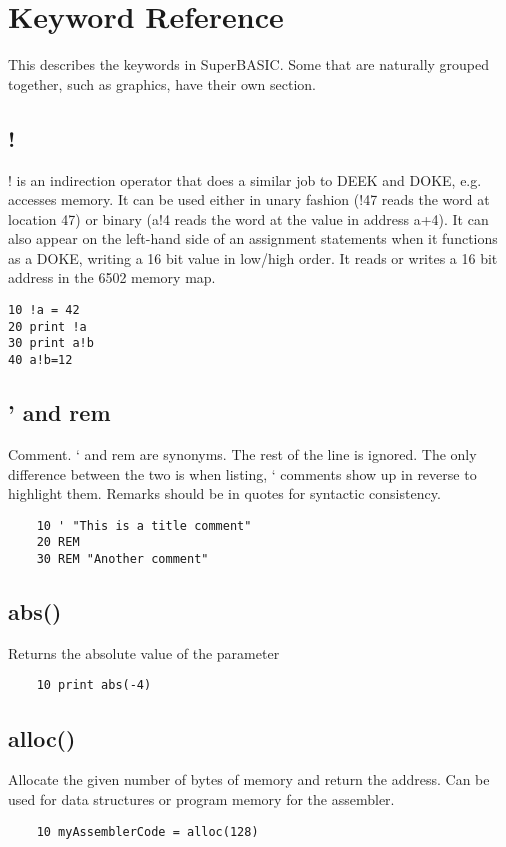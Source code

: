 \chapter{Keyword Reference}

This describes the keywords in SuperBASIC. Some that are naturally grouped together, such as graphics, have their own section.

\section*{!}
! is an indirection operator that does a similar job to DEEK and DOKE, e.g. accesses memory. It can be used either in unary fashion (!47 reads the word at location 47) or binary (a!4 reads the word at the value in address a+4). It can also appear on the left-hand side of an assignment statements when it functions as a DOKE, writing a 16 bit value in low/high order. 
It reads or writes a 16 bit address in the 6502 memory map.
\example{}
\begin{verbatim}
10 !a = 42  
20 print !a   
30 print a!b   
40 a!b=12
\end{verbatim}

\section*{' and rem}
Comment. ‘ and rem are synonyms.  The rest of the line is ignored. The only difference between the two is when listing, ‘ comments show up in reverse to highlight them. Remarks should be in quotes for syntactic consistency.

\begin{verbatim}
	10 ' "This is a title comment"
	20 REM 
	30 REM "Another comment"
\end{verbatim}

\section*{abs()}
Returns the absolute value of the parameter

\example{}
\begin{verbatim}
	10 print abs(-4)
\end{verbatim}

\section*{alloc()}
Allocate the given number of bytes of memory and return the address. Can be used for data structures or program memory for the assembler.
\example{}
\begin{verbatim}
	10 myAssemblerCode = alloc(128)
\end{verbatim}

